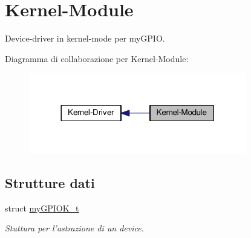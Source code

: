 \hypertarget{group___kernel-_module}{\section{Kernel-\/\+Module}
\label{group___kernel-_module}
}


Device-\/driver in kernel-\/mode per my\+G\+P\+I\+O.  


Diagramma di collaborazione per Kernel-\/\+Module\+:\nopagebreak
\begin{figure}[H]
\begin{center}
\leavevmode
\includegraphics[width=269pt]{group___kernel-_module}
\end{center}
\end{figure}
\subsection*{Strutture dati}
\begin{DoxyCompactItemize}
\item 
struct \hyperlink{structmy_g_p_i_o_k__t}{my\+G\+P\+I\+O\+K\+\_\+t}
\begin{DoxyCompactList}\small\item\em Stuttura per l'astrazione di un device. \end{DoxyCompactList}\end{DoxyCompactItemize}
